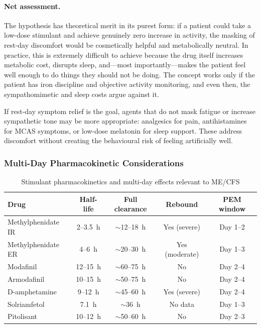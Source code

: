 \paragraph{Net assessment.}
The hypothesis has theoretical merit in its purest form: if a patient could take a low-dose stimulant and achieve genuinely zero increase in activity, the masking of rest-day discomfort would be cosmetically helpful and metabolically neutral. In practice, this is extremely difficult to achieve because the drug itself increases metabolic cost, disrupts sleep, and---most importantly---makes the patient feel well enough to do things they should not be doing. The concept works only if the patient has iron discipline and objective activity monitoring, and even then, the sympathomimetic and sleep costs argue against it.

If rest-day symptom relief is the goal, agents that do not mask fatigue or increase sympathetic tone may be more appropriate: analgesics for pain, antihistamines for MCAS symptoms, or low-dose melatonin for sleep support. These address discomfort without creating the behavioural risk of feeling artificially well.

\subsubsection{Multi-Day Pharmacokinetic Considerations}

\begin{table}[htbp]
\centering
\small
\caption{Stimulant pharmacokinetics and multi-day effects relevant to ME/CFS}
\label{tab:stimulant-pk}
\begin{tabular}{lcccc}
\hline
\textbf{Drug} & \textbf{Half-life} & \textbf{Full clearance} & \textbf{Rebound} & \textbf{PEM window} \\
\hline
Methylphenidate IR & 2--3.5~h & ${\sim}$12--18~h & Yes (severe) & Day 1--2 \\
Methylphenidate ER & 4--6~h & ${\sim}$20--30~h & Yes (moderate) & Day 1--3 \\
Modafinil & 12--15~h & ${\sim}$60--75~h & No & Day 2--4 \\
Armodafinil & 10--15~h & ${\sim}$50--75~h & No & Day 2--4 \\
D-amphetamine & 9--12~h & ${\sim}$45--60~h & Yes (severe) & Day 2--4 \\
Solriamfetol & 7.1~h & ${\sim}$36~h & No data & Day 1--3 \\
Pitolisant & 10--12~h & ${\sim}$50--60~h & No & Day 2--3 \\
\hline
\end{tabular}
\end{table}

